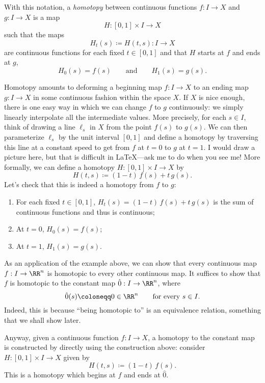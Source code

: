\documentclass{axolotl}
\begin{document}
With this notation, a \textit{homotopy} between continuous functions \(f: I \to X\)
and \(g: I \to X\) is a map
\[ H: [0,1] \times I \to X \]
such that the maps
\[ H_t(s) \coloneqq H(t,s): I \to X \]
are continuous functions for each fixed \(t \in [0,1]\) and that \(H\) starts at
\(f\) and ends at \(g\),
\[ H_0(s) = f(s) \qquad\text{and}\qquad H_1(s) = g(s). \]

Homotopy amounts to deforming a beginning map \(f: I \to X\) to an ending map
\(g: I \to X\) in some continuous fashion within the space \(X\). If \(X\) is
nice enough, there is one easy way in which we can change \(f\) to \(g\)
continuously: we simply linearly interpolate all the intermediate values. More
precisely, for each \(s \in I\), think of drawing a line \(\ell_s\) in \(X\) from the point
\(f(s)\) to \(g(s)\). We can then parameterize \(\ell_s\) by the unit interval
\([0,1]\) and define a homotopy by traversing this line at a constant speed to
get from \(f\) at \(t = 0\) to \(g\) at \(t = 1\). I would draw a picture here,
but that is difficult in \LaTeX---ask me to do when you see me! More formally,
we can define a homotopy \(H: [0,1] \times I \to X\) by
\[ H(t,s) \coloneqq (1 - t)\,f(s) + t\, g(s). \]
Let's check that this is indeed a homotopy from \(f\) to \(g\):
\begin{enumerate}
  \item For each fixed \(t \in [0,1]\), \(H_t(s) = (1 - t)\,f(s) + t\, g(s)\) is
    the sum of continuous functions and thus is continuous;
  \item At \(t = 0\), \(H_0(s) = f(s)\);
  \item At \(t = 1\), \(H_1(s) = g(s)\).
\end{enumerate}

As an application of the example above, we can show that every continuous map
\(f: I \to \RR^n\) is homotopic to every other continuous map. It suffices to
show that \(f\) is homotopic to the constant map \(\hat 0: I \to \RR^n\), where
\[ \hat 0(s) \coloneqq 0 \in \RR^n \qquad\text{for every \(s \in I\)}. \]
Indeed, this is because ``being homotopic to'' is an equivalence relation,
something that we shall show later.

Anyway, given a continuous function \(f: I \to X\), a homotopy to the constant
map is constructed by directly using the construction above: consider \(H:
  [0,1] \times I \to X\) given by
\[ H(t,s) \coloneqq (1-t)\,f(s). \]
This is a homotopy which begins at \(f\) and ends at \(\hat 0\).
\end{document}
